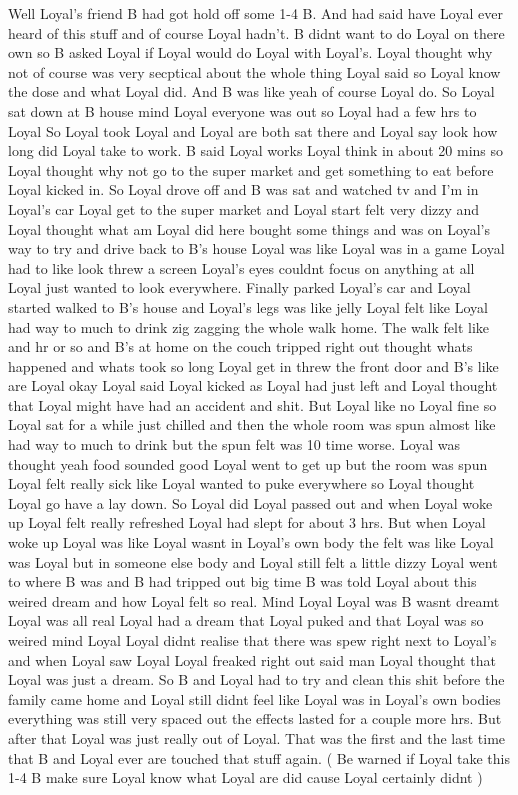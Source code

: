 \documentclass[12pt]{book}
\begin{document}
Well Loyal's friend B had got hold off some 1-4 B. And had said have Loyal ever heard of this stuff and of course Loyal hadn't. B didnt want to do Loyal on there own so B asked Loyal if Loyal would do Loyal with Loyal's. Loyal thought why not of course was very secptical about the whole thing Loyal said so Loyal know the dose and what Loyal did. And B was like yeah of course Loyal do. So Loyal sat down at B house mind Loyal everyone was out so Loyal had a few hrs to Loyal So Loyal took Loyal and Loyal are both sat there and Loyal say look how long did Loyal take to work. B said Loyal works Loyal think in about 20 mins so Loyal thought why not go to the super market and get something to eat before Loyal kicked in. So Loyal drove off and B was sat and watched tv and I'm in Loyal's car Loyal get to the super market and Loyal start felt very dizzy and Loyal thought what am Loyal did here bought some things and was on Loyal's way to try and drive back to B's house Loyal was like Loyal was in a game Loyal had to like look threw a screen Loyal's eyes couldnt focus on anything at all Loyal just wanted to look everywhere. Finally parked Loyal's car and Loyal started walked to B's house and Loyal's legs was like jelly Loyal felt like Loyal had way to much to drink zig zagging the whole walk home. The walk felt like and hr or so and B's at home on the couch tripped right out thought whats happened and whats took so long Loyal get in threw the front door and B's like are Loyal okay Loyal said Loyal kicked as Loyal had just left and Loyal thought that Loyal might have had an accident and shit. But Loyal like no Loyal fine so Loyal sat for a while just chilled and then the whole room was spun almost like had way to much to drink but the spun felt was 10 time worse. Loyal was thought yeah food sounded good Loyal went to get up but the room was spun Loyal felt really sick like Loyal wanted to puke everywhere so Loyal thought Loyal go have a lay down. So Loyal did Loyal passed out and when Loyal woke up Loyal felt really refreshed Loyal had slept for about 3 hrs. But when Loyal woke up Loyal was like Loyal wasnt in Loyal's own body the felt was like Loyal was Loyal but in someone else body and Loyal still felt a little dizzy Loyal went to where B was and B had tripped out big time B was told Loyal about this weired dream and how Loyal felt so real. Mind Loyal Loyal was B wasnt dreamt Loyal was all real Loyal had a dream that Loyal puked and that Loyal was so weired mind Loyal Loyal didnt realise that there was spew right next to Loyal's and when Loyal saw Loyal Loyal freaked right out said man Loyal thought that Loyal was just a dream. So B and Loyal had to try and clean this shit before the family came home and Loyal still didnt feel like Loyal was in Loyal's own bodies everything was still very spaced out the effects lasted for a couple more hrs. But after that Loyal was just really out of Loyal. That was the first and the last time that B and Loyal ever are touched that stuff again. ( Be warned if Loyal take this 1-4 B make sure Loyal know what Loyal are did cause Loyal certainly didnt )
\end{document}
